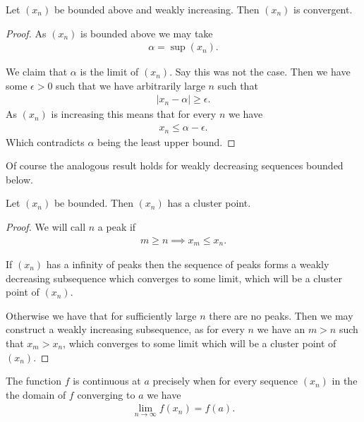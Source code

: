 \documentclass[]{article}
\begin{document}
\begin{thm} 
		Let $(x_n)$ be bounded above and weakly increasing. Then $(x_n)$ is convergent.
\end{thm}

\begin{proof}
		As $(x_n)$ is bounded above we may take
		\begin{align*}
				\alpha = \sup (x_n).
		\end{align*}
		
		We claim that $\alpha $ is the limit of $(x_n)$. Say this was not the case. Then we have some $\epsilon > 0$ such that we have arbitrarily large $n$ such that
		\begin{align*}
			|x_n - \alpha| \geq \epsilon.	
		\end{align*}
		As $(x_n)$ is increasing this means that for every $n$ we have
		\begin{align*}
				x_n \leq \alpha - \epsilon.
		\end{align*}
		Which contradicts $\alpha $ being the least upper bound.
\end{proof}

Of course the analogous result holds for weakly decreasing sequences bounded below.

\begin{thm} 
		Let $(x_n)$ be bounded. Then $(x_n)$ has a cluster point.	
\end{thm}

\begin{proof}
	We will call $n$ a peak if 
	\begin{align*}
			m \geq n \implies x_m \leq x_n.
	\end{align*}

	If  $(x_n)$ has a infinity of peaks then the sequence of peaks forms a weakly decreasing subsequence which converges to some limit, which will be a cluster point of $(x_n)$.

	Otherwise we have that for sufficiently large $n$ there are no peaks. Then we may construct a weakly increasing subsequence, as for every $n$ we have an $m > n$ such that $x_m > x_n$, which converges to some limit which will be a cluster point of $(x_n)$.
\end{proof}

\begin{thm} 
		The function $f$ is continuous at $a$ precisely when for every sequence $(x_n)$ in the the domain of $f$ converging to $a$ we have
		\begin{align*}
				\lim_{n\to\infty} f(x_n) = f(a).
		\end{align*}
\end{thm}
\end{document}
